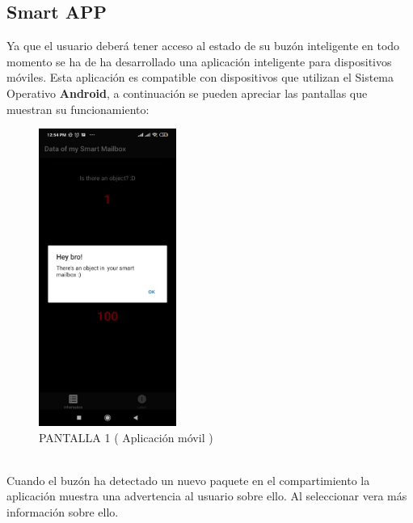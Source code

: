 \documentclass[osajnl,twocolumn,showpacs,superscriptaddress,10pt]{revtex4-1}
\begin{document}
\subsection{Smart APP}
    Ya que el usuario deberá tener acceso al estado de su buzón inteligente en todo momento se ha de ha desarrollado una aplicación inteligente para dispositivos móviles. Esta aplicación es compatible con dispositivos que utilizan el Sistema Operativo \textbf{Android}, a continuación se pueden apreciar las pantallas que muestran su funcionamiento:
    
\begin{figure} [H] \centering 
\caption{PANTALLA 1 ( Aplicación móvil )}
\includegraphics[width=0.4\textwidth]{img4.jpeg} 
\end{figure}
\\
Cuando el buzón ha detectado un nuevo paquete en el compartimiento la aplicación muestra una advertencia al usuario sobre ello. Al seleccionar vera más información sobre ello.
\end{document}
